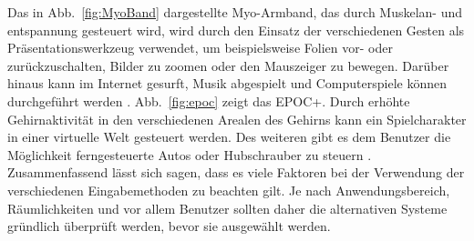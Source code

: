 \newline \newline
Das in Abb.~\ref{fig:MyoBand} dargestellte Myo-Armband, das durch Muskelan- und entspannung gesteuert wird, wird durch den Einsatz der verschiedenen Gesten als Präsentationswerkzeug verwendet, um beispielsweise Folien vor- oder zurückzuschalten, Bilder zu zoomen oder den Mauszeiger zu bewegen. Darüber hinaus kann im Internet gesurft, Musik abgespielt und Computerspiele können durchgeführt werden \cite{myoBand}.
\newline \newline
Abb.~\ref{fig:epoc} zeigt das EPOC+. Durch erhöhte Gehirnaktivität in den verschiedenen Arealen des Gehirns kann ein Spielcharakter in einer virtuelle Welt gesteuert werden. Des weiteren gibt es dem Benutzer die Möglichkeit ferngesteuerte Autos oder Hubschrauber zu steuern \cite{epoc}.
\newline \newline \newline
Zusammenfassend lässt sich sagen, dass es viele Faktoren bei der Verwendung der verschiedenen Eingabemethoden zu beachten gilt. Je nach Anwendungsbereich, Räumlichkeiten und vor allem Benutzer sollten daher die alternativen Systeme gründlich überprüft werden, bevor sie ausgewählt werden.
